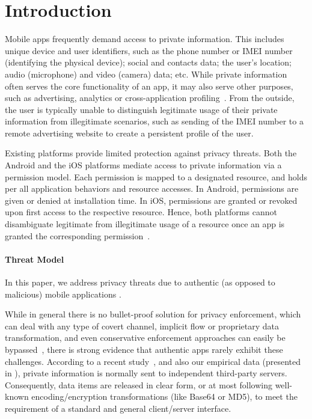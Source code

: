 \section{Introduction}\label{Se:introduction}

Mobile apps frequently demand access to private information. This includes unique device and user identifiers, such as the phone number or IMEI number (identifying the physical device); social and contacts data; the user's location; audio (microphone) and video (camera) data; etc. While private information often serves the core functionality of an app, it may also serve other purposes, such as advertising, analytics or cross-application profiling~\cite{HHJSW:CCS11}. From the outside, the user is typically unable to distinguish legitimate usage of their private information from illegitimate scenarios, such as sending of the IMEI number to a remote advertising website to create a persistent profile of the user.

Existing platforms provide limited protection against privacy threats. Both the Android and the iOS platforms mediate access to private information via a permission model. Each permission is mapped to a designated resource, and holds per all application behaviors and resource accesses. In Android,  permissions are given or denied at installation time. In iOS, permissions are granted or revoked upon first access to the respective resource. Hence, both platforms cannot disambiguate legitimate from illegitimate usage of a resource once an app is granted the corresponding permission~\cite{HMNRSKZ:ASE13}.

\paragraph{Threat Model} In this paper, we address privacy threats due to authentic (as opposed to malicious) mobile applications . 

While in general there is no bullet-proof solution for privacy enforcement, which can deal with any type of covert channel, implicit flow or proprietary data transformation, and even conservative enforcement approaches can easily be bypassed~\cite{SMBK:SECRYPT13}, there is strong evidence that authentic apps rarely exhibit these challenges. According to a recent study~\cite{HHJSW:CCS11}, and also our empirical data (presented in ), private information is normally sent to independent third-party servers. Consequently, data items are released in clear form, or at most following well-known encoding/encryption transformations (like Base64 or MD5), to meet the requirement of a standard and general client/server interface.

